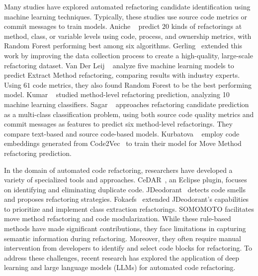 Many studies have explored automated refactoring candidate identification using machine learning techniques. Typically, these studies use source code metrics or commit messages to train models. Aniche \etal{}~\cite{Aniche2020Effectiveness} predict $20$ kinds of refactorings at method, class, or variable levels using code, process, and ownership metrics, with Random Forest performing best among six algorithms. Gerling~\cite{Gerling2020Machine} extended this work by improving the data collection process to create a high-quality, large-scale refactoring dataset. Van Der Leij \etal{}~\cite{van2021data} analyze five machine learning models to predict Extract Method refactoring, comparing results with industry experts. Using $61$ code metrics, they also found Random Forest to be the best performing model. Kumar \etal{}~\cite{Kumar2019Method} studied method-level refactoring prediction, analyzing 10 machine learning classifiers. Sagar \etal{}~\cite{Sagar2021Comparing} approaches refactoring candidate prediction as a multi-class classification problem, using both source code quality metrics and commit messages as features to predict six method-level refactorings. They compare text-based and source code-based models. Kurbatova \etal{}~\cite{Kurbatova2020Recommendation} employ code embeddings generated from Code2Vec~\cite{Alon2019Code2vec} to train their model for Move Method refactoring prediction.

In the domain of automated code refactoring, researchers have developed a variety of specialized tools and approaches. CeDAR~\cite{tairas2012cedar}, an Eclipse plugin, focuses on identifying and eliminating duplicate code. JDeodorant~\cite{JDeodrant, mazinanian2016jdeodorant} detects code smells and proposes refactoring strategies. Fokaefs~\etal{}\cite{fokaefs2012identification} extended JDeodorant's capabilities to prioritize and implement class extraction refactorings. SOMOMOTO\cite{zanetti2014automated} facilitates move method refactoring and code modularization. While these rule-based methods have made significant contributions, they face limitations in capturing semantic information during refactoring. Moreover, they often require manual intervention from developers to identify and select code blocks for refactoring. To address these challenges, recent research has explored the application of deep learning and large language models (LLMs) for automated code refactoring.

